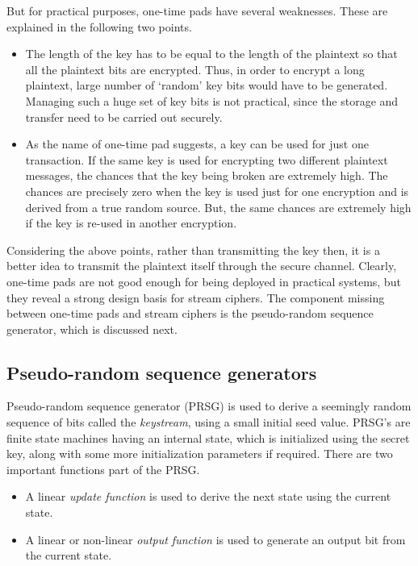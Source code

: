 But for practical purposes, one-time pads have several weaknesses. These are explained in the following two points.
\begin{itemize}
\item The length of the key has to be equal to the length of the plaintext so that all the plaintext bits are encrypted. Thus, in order to encrypt a long plaintext, large number of `random' key bits would have to be generated. Managing such a huge set of key bits is not practical, since the storage and transfer need to be carried out securely. 

\item As the name of one-time pad suggests, a key can be used for just one transaction. If the same key is used for encrypting two different plaintext messages, the chances that the key being broken are extremely high. The chances are precisely zero when the key is used just for one encryption and is derived from a true random source. But, the same chances are extremely high if the key is re-used in another encryption. 
\end{itemize}

Considering the above points, rather than transmitting the key then, it is a better idea to transmit the plaintext itself through the secure channel. Clearly, one-time pads are not good enough for being deployed in practical systems, but they reveal a strong design basis for stream ciphers. The component missing between one-time pads and stream ciphers is the pseudo-random sequence generator, which is discussed next. 


\subsection{Pseudo-random sequence generators}
\label{sec:psrg}

Pseudo-random sequence generator (PRSG) is used to derive a seemingly random sequence of bits called the \emph{keystream}, using a small initial seed value. PRSG's are finite state machines having an internal state, which is initialized using the secret key, along with some more initialization parameters if required. There are two important functions part of the PRSG.
\begin{itemize}
\item A linear \emph{update function} is used to derive the next state using the current state.
\item A linear or non-linear \emph{output function} is used to generate an output bit from the current state. 
\end{itemize}

